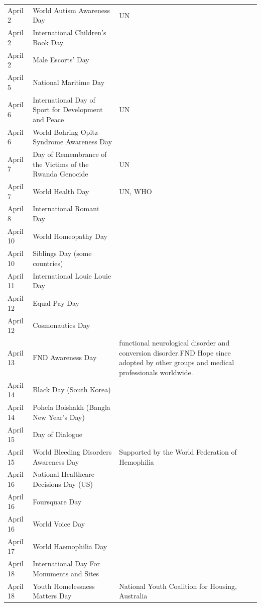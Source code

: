 \documentclass[
  openany]{book}
\begin{document}
\begin{longtable}[t]{>{\raggedright\arraybackslash}p{8em}>{\raggedright\arraybackslash}p{18em}>{\raggedright\arraybackslash}p{10em}}
\rowcolor{gray!6}  April 2 & World Autism Awareness Day & UN\\
April 2 & International Children's Book Day & \\
\rowcolor{gray!6}  April 2 & Male Escorts' Day & \\
April 5 & National Maritime Day & \\
\addlinespace
\rowcolor{gray!6}  April 6 & International Day of Sport for Development and Peace & UN\\
April 6 & World Bohring-Opitz Syndrome Awareness Day & \\
\rowcolor{gray!6}  April 7 & Day of Remembrance of the Victims of the Rwanda Genocide & UN\\
April 7 & World Health Day & UN, WHO\\
\rowcolor{gray!6}  April 8 & International Romani Day & \\
\addlinespace
April 10 & World Homeopathy Day & \\
\rowcolor{gray!6}  April 10 & Siblings Day (some countries) & \\
April 11 & International Louie Louie Day & \\
\rowcolor{gray!6}  April 12 & Equal Pay Day & \\
April 12 & Cosmonautics Day & \\
\addlinespace
\rowcolor{gray!6}  April 13 & FND Awareness Day & functional neurological disorder and conversion disorder.FND Hope since adopted by other groups and medical professionals worldwide.\\
April 14 & Black Day (South Korea) & \\
\rowcolor{gray!6}  April 14 & Pohela Boishakh (Bangla New Year's Day) & \\
April 15 & Day of Dialogue & \\
\rowcolor{gray!6}  April 15 & World Bleeding Disorders Awareness Day & Supported by the World Federation of Hemophilia\\
\addlinespace
April 16 & National Healthcare Decisions Day (US) & \\
\rowcolor{gray!6}  April 16 & Foursquare Day & \\
April 16 & World Voice Day & \\
\rowcolor{gray!6}  April 17 & World Haemophilia Day & \\
April 18 & International Day For Monuments and Sites & \\
\addlinespace
\rowcolor{gray!6}  April 18 & Youth Homelessness Matters Day & National Youth Coalition for Housing, Australia\\

\end{longtable}
\end{document}
